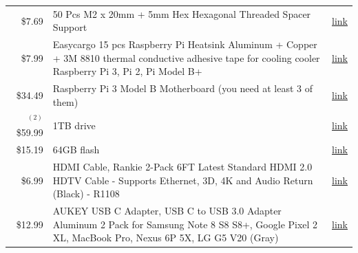 \begin{table}[htb]
{\begin{tabular}{rp{13cm}p{1cm}}
  \$7.69    & 50 Pcs M2 x 20mm + 5mm Hex Hexagonal Threaded
              Spacer Support
                         & 
                           \href{https://www.amazon.com/20mm-Hexagonal-Threaded-Spacer-Support/dp/B00FH8AB8Q/ref=sr\_1\_9?s=industrial\&ie=UTF8\&qid=1513700337\&sr=1-9\&keywords=hex+spacers+m2+20mm}{link}
  \\

  \$7.99  & Easycargo 15 pcs Raspberry Pi Heatsink Aluminum
            + Copper + 3M 8810 thermal conductive adhesive
            tape for cooling cooler Raspberry Pi 3, Pi 2,
            Pi Model B+
                         & 
                           \href{https://www.amazon.com/Easycargo-Raspberry-Heatsink-Aluminum-conductive/dp/B07217N5LS/ref=sr\_1\_3?s=industrial\&ie=UTF8\&qid=1513700498\&sr=1-3\&keywords=raspberry+pi+3}{link}
  \\

  \$34.49 & Raspberry Pi 3 Model B Motherboard  (you need at least 3 of them)   & 
                                                                                  \href{https://www.amazon.com/Raspberry-Pi-RASPBERRYPI3-MODB-1GB-Model-Motherboard/dp/B01CD5VC92}{link}
  \\

 $^{(2)}$ \$59.99 & 1TB drive   & \href{http://wdlabs.wd.com/products/wd-pidrive-berryboot-edition/}{link}    \\

  \$15.19 & 64GB flash  & \href{https://www.wdc.com/products/wdlabs/wd-pidrive-foundation-edition.html\#WD3750LMCW}{link} \\

  \$6.99  & HDMI Cable, Rankie 2-Pack 6FT Latest Standard
            HDMI 2.0 HDTV Cable - Supports Ethernet, 3D, 4K
            and Audio Return (Black) - R1108
                         & 
                           \href{https://www.amazon.com/Cable-Rankie-2-Pack-Latest-Standard/dp/B00Z07XQ4A/ref=sr\_1\_6?s=wireless\&ie=UTF8\&qid=1513782649\&sr=1-6\&keywords=hdmi+cable+6ft}{link}         \\

  \$12.99  & AUKEY USB C Adapter, USB C to USB 3.0 Adapter
             Aluminum 2 Pack for Samsung Note 8 S8 S8+,
             Google Pixel 2 XL, MacBook Pro, Nexus 6P 5X, LG
             G5 V20 (Gray)
                         & 
                           \href{https://www.amazon.com/Cat-Ethernet-Cable-White-Pack/dp/B01IQWGI0O/ref=pd\_sim\_147\_2?\_encoding=UTF8\&psc=1\&refRID=FZZ7E36666EJPDTH7B6A}{link}     \\


\end{tabular}}
\end{table}

